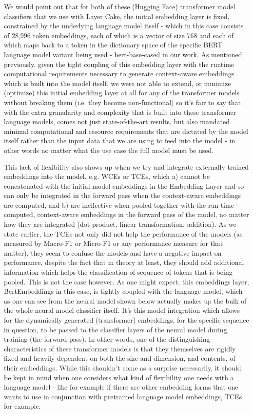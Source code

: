 \documentclass[final]{clv2025-revised}
\begin{document}
We would point out that for both of these (Hugging Face) transformer model classifiers that we use with Layer Cake, the initial embedding layer is fixed, constrained by the underlying language model itself - which in this case consists of 28,996 token embeddings, each of which is a vector of size 768 and each of which maps back to a token in the dictionary space of the specific BERT language model variant being used - bert-base-cased in our work. As mentioned previously, given the tight coupling of this embedding layer with the runtime computational requirements necessary to generate context-aware embeddings which is built into the model itself, we were not able to extend, or minimize (optimize) this initial embedding layer at all for any of the transformer models without breaking them (i.e. they become non-functional) so it's fair to say that with the extra granularity and complexity that is built into these transformer language models, comes not just state-of-the-art results, but also mandated minimal computational and resource requirements that are dictated by the model itself rather than the input data that we are using to feed into the model - in other words no matter what the use case the full model must be used. 

This lack of flexibility also shows up when we try and integrate externally trained embeddings into the model, e.g. WCEs or TCEs, which a) cannot be concatenated with the initial model embeddings in the Embedding Layer and so can only be integrated in the forward pass when the context-aware embeddings are computed, and b) are ineffective when pooled together with the run-time computed, context-aware embeddings in the forward pass of the model, no matter how they are integrated (dot product, linear transformation, addition). As we state earlier, the TCEs not only did not help the performance of the models (as measured by Macro-F1 or Micro-F1 or any performance measure for that matter), they seem to confuse the models and have a negative impact on performance, despite the fact that in theory at least, they should add additional information which helps the classification of sequence of tokens that is being pooled. This is not the case however. As one might expect, this embeddings layer, BertEmbeddings in this case, is tightly coupled with the language model, which as one can see from the neural model shown below actually makes up the bulk of the whole neural model classifier itself. It's this model integration which allows for the dynamically generated (transformer) embeddings, for the specific sequence in question, to be passed to the classifier layers of the neural model during training (the forward pass). In other words, one of the distinguishing characteristics of these transformer models is that they themselves are rigidly fixed and heavily dependent on both the size and dimension, and contents, of their embeddings. While this shouldn't come as a surprise necessarily, it should be kept in mind when one considers what kind of flexibility one needs with a language model - like for example if there are other embedding forms that one wants to use in conjunction with pretrained language model embeddings, TCEs for example.
\end{document}
